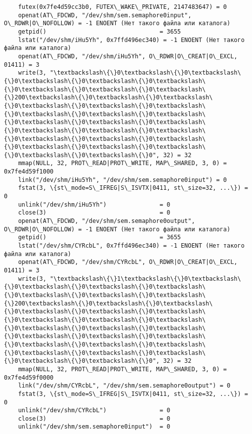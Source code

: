 \documentclass[a4paper, 12pt]{article}
\begin{document}
\begin{verbatim}
	futex(0x7fe4d59cc3b0, FUTEX\_WAKE\_PRIVATE, 2147483647) = 0
	openat(AT\_FDCWD, "/dev/shm/sem.semaphore0input", O\_RDWR|O\_NOFOLLOW) = -1 ENOENT (Нет такого файла или каталога)
	getpid()                                = 3655
	lstat("/dev/shm/iHu5Yh", 0x7ffd496ec340) = -1 ENOENT (Нет такого файла или каталога)
	openat(AT\_FDCWD, "/dev/shm/iHu5Yh", O\_RDWR|O\_CREAT|O\_EXCL, 01411) = 3
	write(3, "\textbackslash\{\}0\textbackslash\{\}0\textbackslash\{\}0\textbackslash\{\}0\textbackslash\{\}0\textbackslash\{\}0\textbackslash\{\}0\textbackslash\{\}0\textbackslash\{\}200\textbackslash\{\}0\textbackslash\{\}0\textbackslash\{\}0\textbackslash\{\}0\textbackslash\{\}0\textbackslash\{\}0\textbackslash\{\}0\textbackslash\{\}0\textbackslash\{\}0\textbackslash\{\}0\textbackslash\{\}0\textbackslash\{\}0\textbackslash\{\}0\textbackslash\{\}0\textbackslash\{\}0\textbackslash\{\}0\textbackslash\{\}0\textbackslash\{\}0\textbackslash\{\}0\textbackslash\{\}0\textbackslash\{\}0\textbackslash\{\}0\textbackslash\{\}0", 32) = 32
	mmap(NULL, 32, PROT\_READ|PROT\_WRITE, MAP\_SHARED, 3, 0) = 0x7fe4d59f1000
	link("/dev/shm/iHu5Yh", "/dev/shm/sem.semaphore0input") = 0
	fstat(3, \{st\_mode=S\_IFREG|S\_ISVTX|0411, st\_size=32, ...\}) = 0
	unlink("/dev/shm/iHu5Yh")               = 0
	close(3)                                = 0
	openat(AT\_FDCWD, "/dev/shm/sem.semaphore0output", O\_RDWR|O\_NOFOLLOW) = -1 ENOENT (Нет такого файла или каталога)
	getpid()                                = 3655
	lstat("/dev/shm/CYRcbL", 0x7ffd496ec340) = -1 ENOENT (Нет такого файла или каталога)
	openat(AT\_FDCWD, "/dev/shm/CYRcbL", O\_RDWR|O\_CREAT|O\_EXCL, 01411) = 3
	write(3, "\textbackslash\{\}1\textbackslash\{\}0\textbackslash\{\}0\textbackslash\{\}0\textbackslash\{\}0\textbackslash\{\}0\textbackslash\{\}0\textbackslash\{\}0\textbackslash\{\}200\textbackslash\{\}0\textbackslash\{\}0\textbackslash\{\}0\textbackslash\{\}0\textbackslash\{\}0\textbackslash\{\}0\textbackslash\{\}0\textbackslash\{\}0\textbackslash\{\}0\textbackslash\{\}0\textbackslash\{\}0\textbackslash\{\}0\textbackslash\{\}0\textbackslash\{\}0\textbackslash\{\}0\textbackslash\{\}0\textbackslash\{\}0\textbackslash\{\}0\textbackslash\{\}0\textbackslash\{\}0\textbackslash\{\}0\textbackslash\{\}0\textbackslash\{\}0", 32) = 32
	mmap(NULL, 32, PROT\_READ|PROT\_WRITE, MAP\_SHARED, 3, 0) = 0x7fe4d59f0000
	link("/dev/shm/CYRcbL", "/dev/shm/sem.semaphore0output") = 0
	fstat(3, \{st\_mode=S\_IFREG|S\_ISVTX|0411, st\_size=32, ...\}) = 0
	unlink("/dev/shm/CYRcbL")               = 0
	close(3)                                = 0
	unlink("/dev/shm/sem.semaphore0input")  = 0

\end{verbatim}
\end{document}
